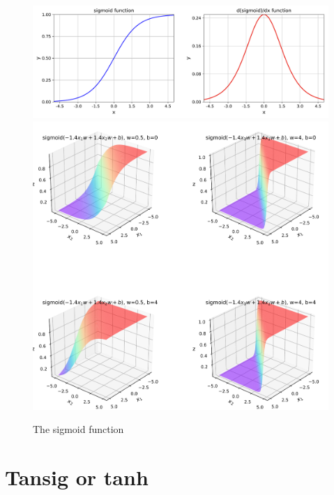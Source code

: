 \begin{figure}[p]
\centering
\includegraphics[width=\textwidth]{pic/sigmoid01}
\includegraphics[width=\textwidth]{pic/sigmoid02}
\caption{The sigmoid function }
\label{fig:sigmoid}
\end{figure}


\section{Tansig or tanh}


